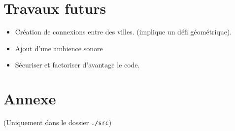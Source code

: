 \documentclass[11pt,a4paper]{article}
\begin{document}
\part{Travaux futurs}
\begin{itemize}
\item Création de connexions entre des villes. (implique un défi géométrique).
\item Ajout d'une ambience sonore 
\item Sécuriser et factoriser d'avantage le code.
\end{itemize}

\newpage

\part*{Annexe}
(Uniquement dans le dossier \texttt{./src})
\end{document}
